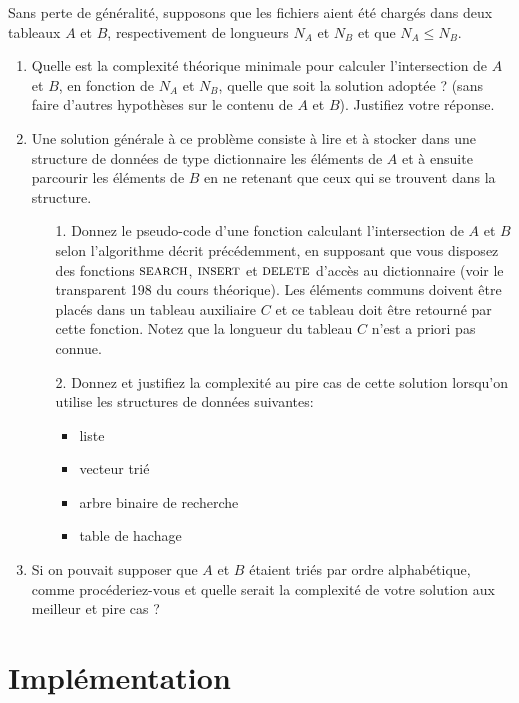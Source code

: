 \documentclass[a4paper,10pt]{article}
\begin{document}
Sans perte de généralité, supposons que les fichiers aient été chargés
dans deux tableaux $A$ et $B$, respectivement de longueurs $N_A$ et $N_B$ et que
$N_A\leq N_B$.
\begin{enumerate}
\item Quelle est la complexité théorique minimale pour calculer
  l'intersection de $A$ et $B$, en fonction de $N_A$ et $N_B$, quelle
  que soit la solution adoptée ? (sans faire d'autres hypothèses sur
  le contenu de $A$ et $B$). Justifiez votre réponse.
\item Une solution générale à ce problème consiste à lire et à stocker
  dans une structure de données de type dictionnaire les éléments de $A$ et à ensuite
  parcourir les éléments de $B$ en ne retenant que ceux qui se
  trouvent dans la structure.

  \begin{enumerate}
    \item[1.] Donnez le pseudo-code d'une fonction calculant
      l'intersection de $A$ et $B$ selon l'algorithme décrit
      précédemment, en supposant que vous disposez des fonctions
      $\textnormal{\scshape search}$, $\textnormal{\scshape insert}$ et $\textnormal{\scshape delete}$ d'accès au
      dictionnaire (voir le transparent 198 du cours théorique).  Les
      éléments communs doivent être placés dans un tableau auxiliaire
      $C$ et ce tableau doit être retourné par cette fonction. Notez
      que la longueur du tableau $C$ n'est a priori pas connue.

    \item[2.] Donnez et justifiez la complexité au pire cas de cette
      solution lorsqu'on utilise les structures de données suivantes:
    \begin{itemize}
    \item liste
    \item vecteur trié
    \item arbre binaire de recherche
    \item table de hachage
    \end{itemize}
  \end{enumerate}
\item Si on pouvait supposer que $A$ et $B$ étaient
  triés par ordre alphabétique, comme procéderiez-vous et quelle
  serait la complexité de votre solution aux meilleur et pire cas ?
\end{enumerate}

\section{Implémentation}
\end{document}
